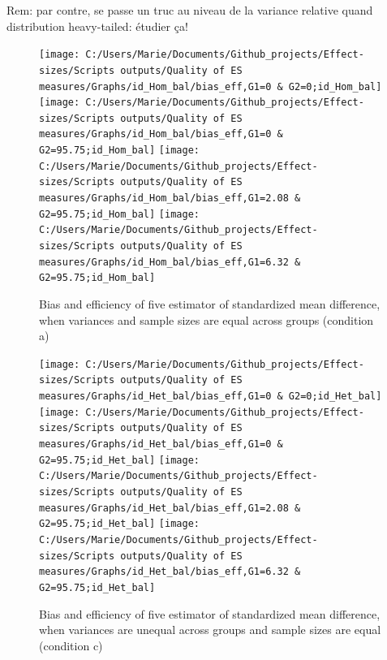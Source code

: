 \documentclass[
  man,floatsintext]{apa6}
\begin{document}
Rem: par contre, se passe un truc au niveau de la variance relative quand distribution heavy-tailed: étudier ça!

\begin{figure}

{\centering \texttt{[image: C:/Users/Marie/Documents/Github\_projects/Effect-sizes/Scripts outputs/Quality of ES measures/Graphs/id\_Hom\_bal/bias\_eff,G1=0 \& G2=0;id\_Hom\_bal]} \texttt{[image: C:/Users/Marie/Documents/Github\_projects/Effect-sizes/Scripts outputs/Quality of ES measures/Graphs/id\_Hom\_bal/bias\_eff,G1=0 \& G2=95.75;id\_Hom\_bal]} \texttt{[image: C:/Users/Marie/Documents/Github\_projects/Effect-sizes/Scripts outputs/Quality of ES measures/Graphs/id\_Hom\_bal/bias\_eff,G1=2.08 \& G2=95.75;id\_Hom\_bal]} \texttt{[image: C:/Users/Marie/Documents/Github\_projects/Effect-sizes/Scripts outputs/Quality of ES measures/Graphs/id\_Hom\_bal/bias\_eff,G1=6.32 \& G2=95.75;id\_Hom\_bal]} 

}

\caption{Bias and efficiency of five estimator of standardized mean difference, when variances and sample sizes are equal across groups (condition a)}\label{fig:idHombal}
\end{figure}

\begin{figure}

{\centering \texttt{[image: C:/Users/Marie/Documents/Github\_projects/Effect-sizes/Scripts outputs/Quality of ES measures/Graphs/id\_Het\_bal/bias\_eff,G1=0 \& G2=0;id\_Het\_bal]} \texttt{[image: C:/Users/Marie/Documents/Github\_projects/Effect-sizes/Scripts outputs/Quality of ES measures/Graphs/id\_Het\_bal/bias\_eff,G1=0 \& G2=95.75;id\_Het\_bal]} \texttt{[image: C:/Users/Marie/Documents/Github\_projects/Effect-sizes/Scripts outputs/Quality of ES measures/Graphs/id\_Het\_bal/bias\_eff,G1=2.08 \& G2=95.75;id\_Het\_bal]} \texttt{[image: C:/Users/Marie/Documents/Github\_projects/Effect-sizes/Scripts outputs/Quality of ES measures/Graphs/id\_Het\_bal/bias\_eff,G1=6.32 \& G2=95.75;id\_Het\_bal]} 

}

\caption{Bias and efficiency of five estimator of standardized mean difference, when variances are unequal across groups and sample sizes are equal (condition c)}\label{fig:idHetbal}
\end{figure}
\end{document}
